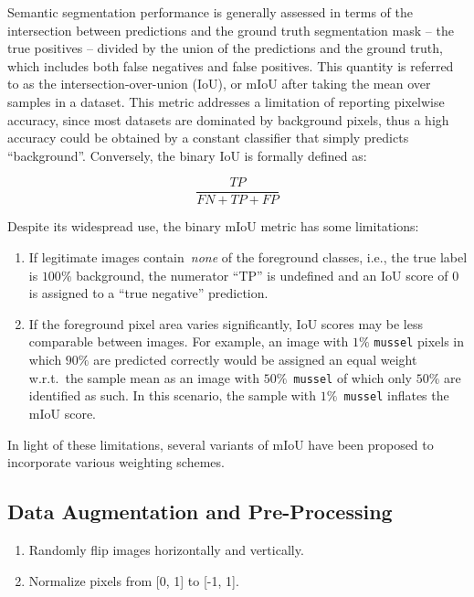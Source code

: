 \documentclass[11pt]{article} %
\begin{document}
Semantic segmentation performance is generally assessed in terms of the
intersection between predictions and the ground truth segmentation mask -- the
true positives -- divided by the union of the predictions and the ground truth, 
which includes both false negatives and false positives. This quantity is
referred to as the intersection-over-union (IoU), or mIoU after taking the
mean over samples in a dataset. This metric addresses a limitation of reporting 
pixelwise accuracy, since most datasets are dominated by background pixels,
thus a high accuracy could be obtained by a constant classifier that simply
predicts ``background''. Conversely, the binary IoU is formally defined as:

\begin{equation}
\frac{TP}{FN + TP + FP}
\end{equation}

Despite its widespread use, the binary mIoU metric has some limitations:

\begin{enumerate}
\item If legitimate images contain~\emph{none} of the foreground classes, i.e.,
the true label is $100\%$ background, the numerator ``TP'' is undefined and an
IoU score of 0 is assigned to a ``true negative'' prediction.

\item If the foreground pixel area varies significantly, IoU 
scores may be less comparable between images. For example, an image with $1\%$
\texttt{mussel} pixels in which $90\%$ are predicted correctly would be assigned
an equal weight w.r.t.~the sample mean as an image with $50\%$~\texttt{mussel}
of which only $50\%$ are identified as such. In this scenario, the sample with
$1\%$~\texttt{mussel} inflates the mIoU score.
\end{enumerate}

In light of these limitations, several variants of mIoU have been proposed to 
incorporate various weighting schemes.

\subsection{Data Augmentation and Pre-Processing}

\begin{enumerate}

\item Randomly flip images horizontally and vertically.

\item Normalize pixels from [0, 1] to [-1, 1].

\end{enumerate}
\end{document}
